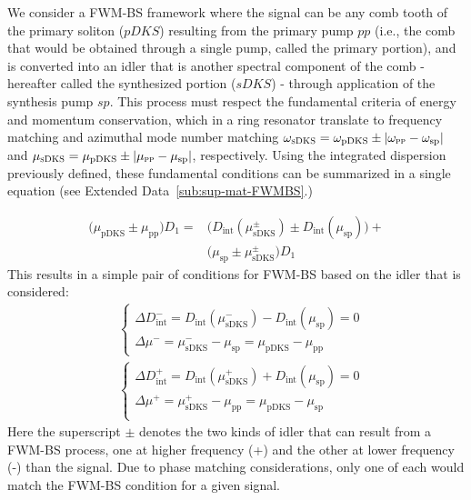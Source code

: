 \documentclass[reprint,superscriptaddress, amsmath,amssymb,pra, aps,floatfix,longbibliography]{revtex4-1}
\begin{document}
We consider a FWM-BS framework where the signal can be any comb tooth of the primary soliton ($pDKS$) resulting from the primary pump $pp$ (i.e., the comb that would be obtained through a single pump, called the primary portion), and is converted into an idler that is another spectral component of the comb - hereafter called the synthesized portion ($sDKS$) - through application of the synthesis pump $sp$. This process must respect the fundamental criteria of energy and momentum conservation, which in a ring resonator translate to frequency matching and azimuthal mode number matching $\omega_\textsc{sDKS}  = \omega_\mathrm{pDKS} \pm |\omega_\textsc{pp} - \omega_\mathrm{sp}|$ and $\mu_\textsc{sDKS}  = \mu_\mathrm{pDKS} \pm |\mu_\textsc{pp} - \mu_\mathrm{sp}|$, respectively. Using the integrated dispersion previously defined, these fundamental conditions can be summarized in a single equation (see Extended Data~\cref{sub:sup-mat-FWMBS}.)

\begin{align}
    \label{eq:dint-fwm-general}
    \Big (\mu_\mathrm{pDKS} \pm \mu_\mathrm{pp} \Big)D_1 =
    & \Big( D_\mathrm{int}(\mu_\mathrm{sDKS}^{\pm}) \pm D_\mathrm{int}(\mu_\mathrm{sp}) \Big) + \nonumber \\ &  \Big( \mu_\mathrm{sp} \pm \mu_\mathrm{sDKS}^{\pm} \Big)D_1
\end{align}
This results in a simple pair of conditions for FWM-BS based on the idler that is considered:
\begin{align}
    &\begin{cases}
        \label{eq:FWM-BS-pair-m}
        \Delta D_\mathrm{int}^{-} =  D_\mathrm{int}(\mu_\mathrm{sDKS}^{-}) -  D_\mathrm{int}(\mu_\mathrm{sp}) = 0\\
        \Delta \mu^{-} =  \mu_\mathrm{sDKS}^{-} - \mu_\mathrm{sp} = \mu_\mathrm{pDKS} - \mu_\mathrm{pp}
    \end{cases}\\
    &\begin{cases}
        \label{eq:FWM-BS-pair-p}
        \Delta D_\mathrm{int}^{+}  = D_\mathrm{int}(\mu_\mathrm{sDKS}^{+})  + D_\mathrm{int}(\mu_\mathrm{sp}) = 0\\
        \Delta \mu^{+} = \mu_\mathrm{sDKS}^{+} - \mu_\mathrm{pp} = \mu_\mathrm{pDKS} - \mu_\mathrm{sp} \\
    \end{cases}
\end{align}
Here the superscript $\pm$ denotes the two kinds of idler that can result from a FWM-BS process, one at higher frequency (+) and the other at lower frequency (-) than the signal. Due to phase matching considerations,  only one of each would match the FWM-BS condition for a given signal.
\end{document}
